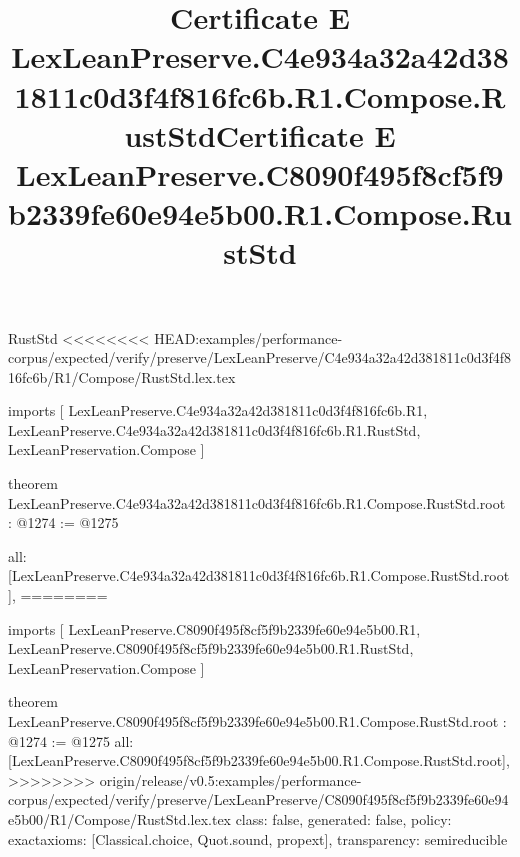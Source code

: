 \begin{lexlean}{RustStd}
<<<<<<<< HEAD:examples/performance-corpus/expected/verify/preserve/LexLeanPreserve/C4e934a32a42d381811c0d3f4f816fc6b/R1/Compose/RustStd.lex.tex
\title{Certificate E LexLeanPreserve.C4e934a32a42d381811c0d3f4f816fc6b.R1.Compose.RustStd}
\begin{coremodule}
imports [
  LexLeanPreserve.C4e934a32a42d381811c0d3f4f816fc6b.R1,
  LexLeanPreserve.C4e934a32a42d381811c0d3f4f816fc6b.R1.RustStd,
  LexLeanPreservation.Compose
]

theorem LexLeanPreserve.C4e934a32a42d381811c0d3f4f816fc6b.R1.Compose.RustStd.root : @1274 := @1275 {
  all: [LexLeanPreserve.C4e934a32a42d381811c0d3f4f816fc6b.R1.Compose.RustStd.root],
========
\title{Certificate E LexLeanPreserve.C8090f495f8cf5f9b2339fe60e94e5b00.R1.Compose.RustStd}
\begin{coremodule}
imports [
  LexLeanPreserve.C8090f495f8cf5f9b2339fe60e94e5b00.R1,
  LexLeanPreserve.C8090f495f8cf5f9b2339fe60e94e5b00.R1.RustStd,
  LexLeanPreservation.Compose
]

theorem LexLeanPreserve.C8090f495f8cf5f9b2339fe60e94e5b00.R1.Compose.RustStd.root : @1274 := @1275 {
  all: [LexLeanPreserve.C8090f495f8cf5f9b2339fe60e94e5b00.R1.Compose.RustStd.root],
>>>>>>>> origin/release/v0.5:examples/performance-corpus/expected/verify/preserve/LexLeanPreserve/C8090f495f8cf5f9b2339fe60e94e5b00/R1/Compose/RustStd.lex.tex
  class: false,
  generated: false,
  policy: exact{axioms: [Classical.choice, Quot.sound, propext]},
  transparency: semireducible
}


\end{coremodule}}
\end{coremodule}
\end{lexlean}
